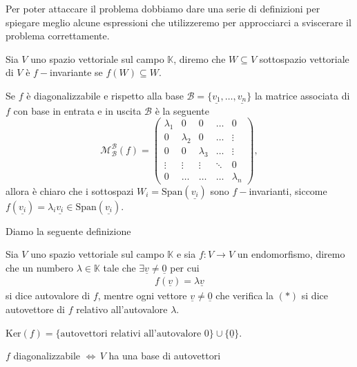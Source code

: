 Per poter attaccare il problema dobbiamo dare una serie di definizioni per spiegare meglio alcune espressioni che utilizzeremo per approcciarci a sviscerare il problema correttamente.
\begin{definition}
    Sia $V$ uno spazio vettoriale sul campo $\mathbb{K}$, diremo che $W \subseteq V$ sottospazio vettoriale di $V$ è $f-$invariante se $f(W) \subseteq W$.
\end{definition}
\begin{example}
    Se $f$ è diagonalizzabile e rispetto alla base $\mathcal{B} = \{ \underline{v_1}, \ldots, \underline{v_n} \}$ la matrice associata di $f$ con base in entrata e in uscita $\mathcal{B}$ è la seguente
    $$
        \mathcal{M}^\mathcal{B}_\mathcal{B}(f) = \begin{pmatrix}
            \lambda_1 & 0 & 0 & \ldots & 0 \\
            0 & \lambda_2 & 0 & \ldots & \vdots \\
            0 & 0 & \lambda_3 & \ldots & \vdots \\
            \vdots & \vdots & \vdots & \ddots & 0 \\
            0 & \ldots & \ldots & \ldots & \lambda_n
        \end{pmatrix},
    $$
    allora è chiaro che i sottospazi $W_i = \text{Span}(\underline{v_i})$ sono $f-$invarianti, siccome $f(\underline{v_i}) = \lambda_i \underline{v_i} \in \text{Span}(\underline{v_i})$.
\end{example}
Diamo la seguente definizione
\begin{definition}
    Sia $V$ uno spazio vettoriale sul campo $\mathbb{K}$ e sia $f: V \to V$ un endomorfismo, diremo che un numbero $\lambda \in \mathbb{K}$ tale che $\exists \underline{v} \neq \underline{0}$ per cui
    \begin{align}
        f(\underline{v}) = \lambda \underline{v} \tag{$\ast$}
    \end{align}
    si dice autovalore di $f$, mentre ogni vettore $\underline{v} \neq \underline{0}$ che verifica la $(\ast)$ si dice autovettore di $f$ relativo all'autovalore $\lambda$.
\end{definition}
\begin{remark}
    $\text{Ker}(f) = \{ \text{autovettori relativi all'autovalore } 0 \} \cup \{ \underline{0} \}$.
\end{remark}
\begin{remark}
    $f$ diagonalizzabile $\iff \, V$ ha una base di autovettori
\end{remark}
